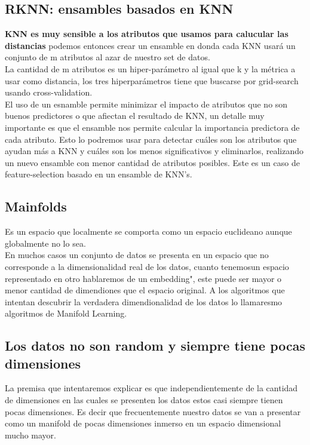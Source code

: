 \documentclass[titlepage,a4paper]{article}
\begin{document}
\subsection*{RKNN: ensambles basados en KNN}
\textbf{KNN es muy sensible a los atributos que usamos para calucular las distancias} podemos entonces crear un ensamble en donda cada KNN usará un conjunto de m atributos al azar de nuestro set de datos. \\
La cantidad de m atributos es un hiper-parámetro al igual que k y la métrica a usar como distancia, los tres hiperparámetros tiene que buscarse  por grid-search usando cross-validation. \\

El uso de un esnamble permite minimizar el impacto de atributos que no son buenos predictores o que afiectan el resultado de KNN, un detalle muy importante es que el ensamble nos permite calcular la importancia predictora de cada atributo. Esto lo podremos usar para detectar cuáles son los atributos que ayudan más a KNN y cuáles son los menos significativos y eliminarlos, realizando un nuevo ensamble con menor cantidad de atributos posibles. Este es un caso de feature-selection basado en un ensamble de KNN's. \\

\subsection*{Mainfolds}
Es un espacio que localmente se comporta como un espacio euclideano aunque globalmente no lo sea. \\

En muchos casos un conjunto de datos se presenta en un espacio que no corresponde a la dimensionalidad real de los datos, cuanto tenemosun espacio representado en otro hablaremos de un embedding", este puede ser mayor o menor cantidad de dimendiones que el espacio original. A los algoritmos que intentan descubrir la verdadera dimendionalidad de los datos lo llamaresmo algoritmos de Manifold Learning. \\

\subsection*{Los datos no son random y siempre tiene pocas dimensiones}
La premisa que intentaremos explicar es que independientemente de la cantidad de dimensiones en las cuales se presenten los datos estos casi siempre tienen pocas dimensiones. Es decir que frecuentemente nuestro datos se van a presentar como un manifold de pocas dimensiones inmerso en un espacio dimensional mucho mayor. \\
\end{document}
